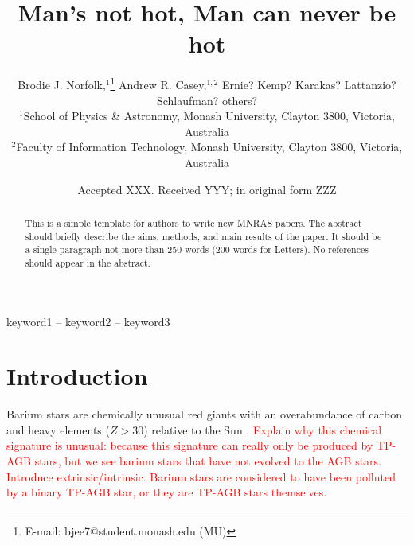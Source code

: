 \documentclass[a4paper,fleqn,usenatbib]{mnras}
\title[Short title, max. 45 characters]{Man's not hot, Man can never be hot}
\author[B. J. Norfolk et al.]{Brodie J. Norfolk,$^{1}$\thanks{E-mail: bjee7@student.monash.edu (MU)}
Andrew R. Casey,$^{1,2}$
Ernie? Kemp? Karakas? Lattanzio? \newauthor
Schlaufman? others?
\\
$^{1}$School of Physics \& Astronomy, Monash University, Clayton 3800, Victoria, Australia\\
$^{2}$Faculty of Information Technology, Monash University, Clayton 3800, Victoria, Australia\\
}
\date{Accepted XXX. Received YYY; in original form ZZZ}
\newcommand{\todo}[1]{\textcolor{red}{#1}}
\begin{document}
\label{firstpage}
\pagerange{\pageref{firstpage}--\pageref{lastpage}}
\maketitle

\begin{abstract}
This is a simple template for authors to write new MNRAS papers.
The abstract should briefly describe the aims, methods, and main results of the paper.
It should be a single paragraph not more than 250 words (200 words for Letters).
No references should appear in the abstract.
\end{abstract}

\begin{keywords}
keyword1 -- keyword2 -- keyword3
\end{keywords}


\section{Introduction}



Barium stars are chemically unusual red giants with an overabundance of carbon and heavy elements ($Z > 30$) relative to the Sun \citep{Bidelman1951}. \todo{Explain why this chemical signature is unusual: because this signature can really only be produced by TP-AGB stars, but we see barium stars that have not evolved to the AGB stars. Introduce extrinsic/intrinsic. Barium stars are considered to have been polluted by a binary TP-AGB star, or they are TP-AGB stars themselves.}


\end{document}

